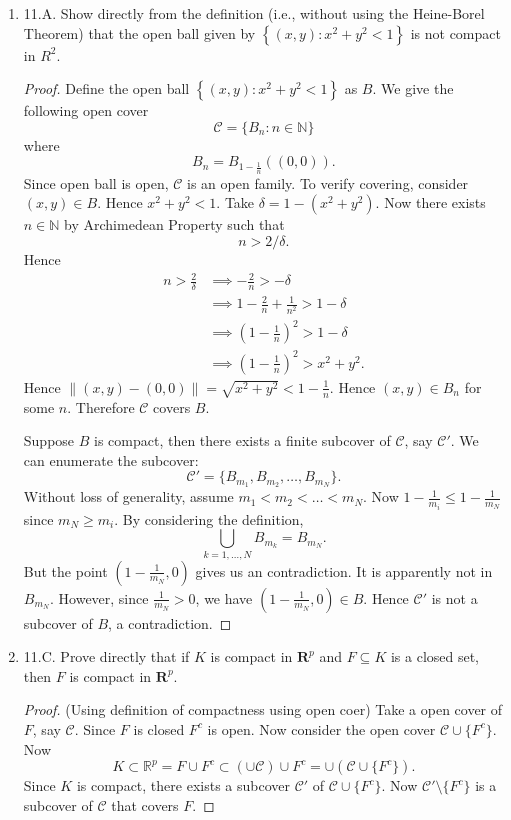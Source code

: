 \begin{enumerate}
	\item 11.A. Show directly from the definition (i.e., without using the Heine-Borel Theorem) that the open ball given by $\left\{(x, y): x^2+y^2<1\right\}$ is not compact in $R^2$.
\begin{proof}
	Define the open ball $\left\{(x, y): x^2+y^2<1\right\}$ as $B$.
	We give the following open cover \[
		\mathcal{C} = \{B_n: n \in \mathbb{N}\} 
	\]
	where \[
		B_n = B_{1- \frac{1}{n}}((0,0))
	.\] 
	Since open ball is open, $\mathcal{C}$ is an open family. To verify covering, consider $(x,y) \in B$. Hence $x^2 + y^2 < 1$. Take $\delta = 1 - (x^2 + y^2)$.
	Now there exists $n \in \mathbb{N}$ by Archimedean Property such that 
	\[
		 n > 2 / \delta
	.\] 
	Hence 
	\begin{align*}
		n> \frac{2}{\delta}
		&\implies - \frac{2}{n}> -\delta \\
		&\implies 1 - \frac{2}{n} + \frac{1}{n^2} > 1 - \delta \\
		&\implies (1-\frac{1}{n})^2 > 1 - \delta \\
		&\implies (1-\frac{1}{n})^2 > x^2 + y^2
	.\end{align*}
	Hence $\|(x,y) - (0,0)\| = \sqrt{x^2 + y^2} < 1-\frac{1}{n}$. Hence $(x,y) \in B_n$ for some $n$.
	Therefore $\mathcal{C}$ covers $B$. 

	Suppose  $B$ is compact, then there exists a finite subcover of $\mathcal{C}$, say $\mathcal{C}'$. We can enumerate the subcover: \[
		\mathcal{C}' = \{B_{m_1}, B_{m_2}, \ldots, B_{m_N}\} 
	.\] 
	Without loss of generality, assume $m_1 < m_2 < \ldots < m_N$. Now $1-\frac{1}{m_i}\le 1-\frac{1}{m_N}$ since $m_N \ge m_i$. By considering the definition,
	\[
		\bigcup_{k = 1,\ldots,N} B_{m_k} = B_{m_N}
	.\] 
	But the point $(1-\frac{1}{m_{N}}, 0)$ gives us an contradiction. It is apparently not in $B_{m_N}$. However, since $\frac{1}{m_N}> 0$, we have $(1-\frac{1}{m_N}, 0) \in B$. Hence $\mathcal{C}'$ is not a subcover of $B$, a contradiction.
\end{proof}

	\item 11.C. Prove directly that if $K$ is compact in $\boldsymbol{R}^p$ and $F \subseteq K$ is a closed set, then $F$ is compact in $\boldsymbol{R}^p$.
\begin{proof}(Using definition of compactness using open coer)
	Take a open cover of $F$, say $\mathcal{C}$. Since $F$ is closed $F^c$ is open. Now consider the open cover $\mathcal{C} \cup \{F^c\} $. Now \[
		K \subset \mathbb{R}^p = F \cup F^c \subset \left( \cup \mathcal{C} \right)  \cup F^c = \cup (\mathcal{C} \cup \{F^c\} )
	.\] 
	Since $K$ is compact, there exists a subcover $\mathcal{C}'$ of $\mathcal{C} \cup \{F^c\}$. Now $\mathcal{C}' \setminus \{F^c\} $ is a subcover of $\mathcal{C}$ that covers $F$.
\end{proof}


\end{enumerate}
